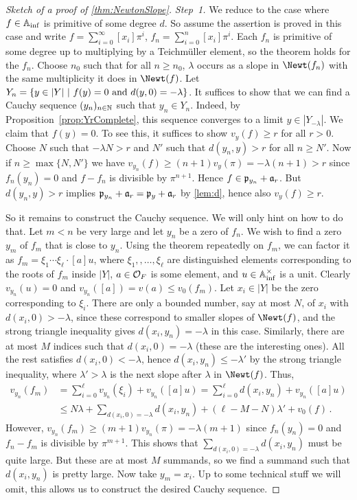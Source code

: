 \documentclass[a4paper, 10pt, oneside, DIV=9, chapterprefix=true, numbers=enddot,bibliography=totoc]{scrbook}
\begin{document}
\begin{proof}[Sketch of a proof of \cref{thm:NewtonSlope}]
	\emph{Step~1.} We reduce to the case where $f\in\mathbb{A}_{\mathrm{inf}}$ is primitive of some degree $d$. So assume the assertion is proved in this case and write $f=\sum_{i=0}^\infty [x_i]\pi^i$, $f_n=\sum_{i=0}^n[x_i]\pi^i$. Each $f_n$ is primitive of some degree up to multiplying by a Teichmüller element, so the theorem holds for the $f_n$. Choose $n_0$ such that for all $n\geq n_0$, $\lambda$ occurs as a slope in $\Newt(f_n)$ with the same multiplicity it does in $\Newt(f)$. Let $Y_n=\left\{y\in|Y|\ \middle|\  f(y)=0\text{ and }d(y,0)=-\lambda\right\}$. It suffices to show that we can find a Cauchy sequence $(y_n)_{n\in\mathbb{N}}$ such that $y_n\in Y_n$. Indeed, by Proposition~\cref{prop:YrComplete}, this sequence converges to a limit $y\in |Y_{-\lambda}|$. We claim that $f(y)=0$. To see this, it suffices to show $v_y(f)\geq r$ for all $r>0$. Choose $N$ such that $-\lambda N>r$ and $N'$ such that $d(y_n,y)>r$ for all $n\geq N'$. Now if $n\geq\max\{N,N'\}$ we have $v_{y_n}(f)\geq (n+1)v_y(\pi)=-\lambda(n+1)>r$ since $f_n(y_n)=0$ and $f-f_n$ is divisible by $\pi^{n+1}$. Hence $f\in\mathfrak{p}_{y_n}+\mathfrak{a}_r$. But $d(y_n,y)>r$ implies $\mathfrak{p}_{y_n}+\mathfrak{a}_r=\mathfrak{p}_y+\mathfrak{a}_r$ by \cref{lem:d}, hence also $v_y(f)\geq r$.
	
	So it remains to construct the Cauchy sequence. We will only hint on how to do that. Let $m<n$ be very large and let $y_n$ be a zero of $f_n$. We wish to find a zero $y_m$ of $f_m$ that is close to $y_n$. Using the theorem repeatedly on $f_m$, we can factor it as $f_m=\xi_1\dotsm\xi_\ell\cdot [a] u$, where $\xi_1,,\dots,\xi_\ell$ are distinguished elements corresponding to the roots of $f_m$ inside $|Y|$, $a\in\mathcal{O}_F$ is some element, and $u\in\mathbb{A}_{\mathrm{inf}}^\times$ is a unit. Clearly $v_{y_n}(u)=0$ and $v_{y_n}([a])=v(a)\leq v_0(f_m)$. Let $x_i\in|Y|$ be the zero corresponding to $\xi_i$. There are only a bounded number, say at most $N$, of $x_i$ with $d(x_i,0)>-\lambda$, since these correspond to smaller slopes of $\Newt(f)$, and the strong triangle inequality gives $d(x_i,y_n)=-\lambda$ in this case. Similarly, there are at most $M$ indices such that $d(x_i,0)=-\lambda$ (these are the interesting ones). All the rest satisfies $d(x_i,0)<-\lambda$, hence $d(x_i,y_n)\leq -\lambda'$ by the strong triangle inequality, where $\lambda'>\lambda$ is the next slope after $\lambda$ in $\Newt(f)$. Thus,
	\begin{align*}
		v_{y_n}(f_m)&=\sum_{i=0}^\ell v_{y_n}(\xi_i)+v_{y_n}([a]u)=\sum_{i=0}^\ell d(x_i,y_n)+v_{y_n}([a]u)\\
		&\leq N\lambda+\sum_{d(x_i,0)=-\lambda}d(x_i,y_n)+(\ell-M-N)\lambda'+v_0(f)\,.
	\end{align*}
	However, $v_{y_n}(f_m)\geq (m+1)v_{y_n}(\pi)=-\lambda(m+1)$ since $f_n(y_n)=0$ and $f_n-f_m$ is divisible by $\pi^{m+1}$. This shows that $\sum_{d(x_i,0)=-\lambda}d(x_i,y_n)$ must be quite large. But these are at most $M$ summands, so we find a summand such that $d(x_i,y_n)$ is pretty large. Now take $y_m=x_i$. Up to some technical stuff we will omit, this allows us to construct the desired Cauchy sequence.
	

\end{proof}
\end{document}
